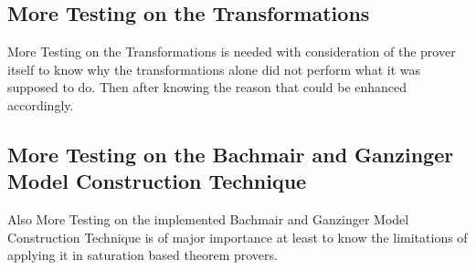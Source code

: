 		\subsection{More Testing on the Transformations}\label{sub:c7s2s2}
		More Testing on the Transformations is needed with consideration of the prover itself to know why the transformations alone did not perform what it was supposed to do. Then after knowing the reason that could be enhanced accordingly.
		
		\subsection{More Testing on the Bachmair and Ganzinger Model Construction Technique}\label{sub:c7s2s3}
		Also More Testing on the implemented Bachmair and Ganzinger Model Construction Technique is of major importance at least to know the limitations of applying it in saturation based theorem provers. 		
		
		
		
		
		
		
		
		
		
		
		
		
		
		
		
		
		

